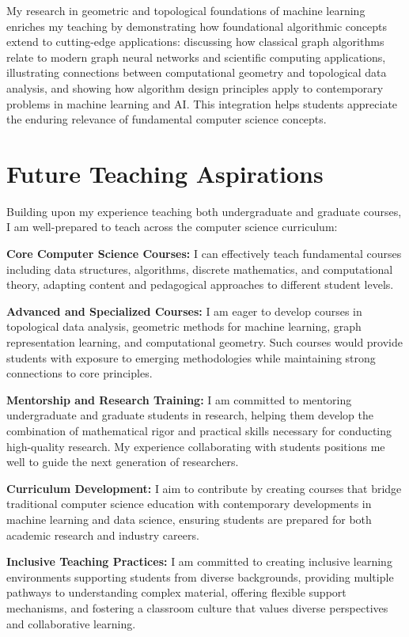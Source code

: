 \documentclass[11pt,letterpaper]{article}
\begin{document}
My research in geometric and topological foundations of machine learning enriches my teaching by demonstrating how foundational algorithmic concepts extend to cutting-edge applications: discussing how classical graph algorithms relate to modern graph neural networks and scientific computing applications, illustrating connections between computational geometry and topological data analysis, and showing how algorithm design principles apply to contemporary problems in machine learning and AI. This integration helps students appreciate the enduring relevance of fundamental computer science concepts.

\section*{Future Teaching Aspirations}

Building upon my experience teaching both undergraduate and graduate courses, I am well-prepared to teach across the computer science curriculum:

\textbf{Core Computer Science Courses:} I can effectively teach fundamental courses including data structures, algorithms, discrete mathematics, and computational theory, adapting content and pedagogical approaches to different student levels.

\textbf{Advanced and Specialized Courses:} I am eager to develop courses in topological data analysis, geometric methods for machine learning, graph representation learning, and computational geometry. Such courses would provide students with exposure to emerging methodologies while maintaining strong connections to core principles.

\textbf{Mentorship and Research Training:} I am committed to mentoring undergraduate and graduate students in research, helping them develop the combination of mathematical rigor and practical skills necessary for conducting high-quality research. My experience collaborating with students positions me well to guide the next generation of researchers.

\textbf{Curriculum Development:} I aim to contribute by creating courses that bridge traditional computer science education with contemporary developments in machine learning and data science, ensuring students are prepared for both academic research and industry careers.

\textbf{Inclusive Teaching Practices:} I am committed to creating inclusive learning environments supporting students from diverse backgrounds, providing multiple pathways to understanding complex material, offering flexible support mechanisms, and fostering a classroom culture that values diverse perspectives and collaborative learning.
\end{document}
